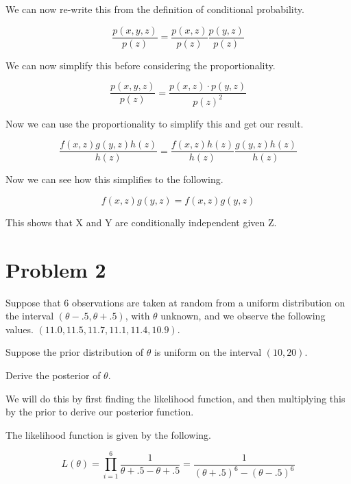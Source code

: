 \documentclass[12pt, letterpaper]{article}
\begin{document}
We can now re-write this from the definition of conditional probability. 

\begin{equation} 
\frac{p(x, y, z)}{p(z)} = \frac{p(x, z)}{p(z)} \frac{p(y, z)}{p(z)} 
\end{equation} 

We can now simplify this before considering the proportionality. 

\begin{equation} 
\frac{p(x, y, z)}{p(z)} = \frac{p(x, z) \cdot p(y, z)}{p(z)^2} 
\end{equation} 

Now we can use the proportionality to simplify this and get our result. 

\begin{equation}
\frac{f(x, z) g(y, z) h(z)}{h(z)} = \frac{f(x, z) h(z)}{h(z)} \frac{g(y, z) h(z)}{h(z)} 
\end{equation} 

Now we can see how this simplifies to the following. 

\begin{equation} 
f(x, z) g(y, z) = f(x, z) g(y, z) 
\end{equation} 

This shows that X and Y are conditionally independent given Z. 

\section{Problem 2}

Suppose that 6 observations are taken at random from a uniform distribution on the interval $(\theta - .5 , \theta + .5)$, with $\theta$ unknown, and we observe the following values. $(11.0, 11.5, 11.7, 11.1, 11.4, 10.9)$. 

Suppose the prior distribution of $\theta$ is uniform on the interval $(10, 20)$.

Derive the posterior of $\theta$. 

We will do this by first finding the likelihood function, and then multiplying this by the prior to derive our posterior function. 

The likelihood function is given by the following. 

\begin{equation}
L(\theta) = \prod_{i=1}^{6} \frac{1}{\theta + .5 - \theta + .5} = \frac{1}{(\theta + .5)^6 - (\theta - .5)^6} 
\end{equation} 
\end{document}
